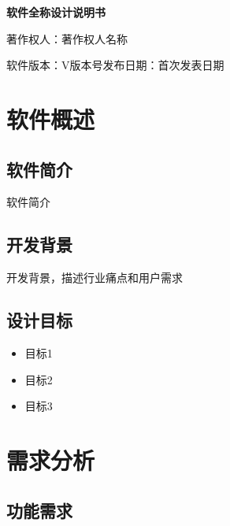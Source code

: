 \documentclass[a4paper,12pt]{article}
\begin{document}
\begin{center}
  {\LARGE\bfseries {{软件全称}}\quad 设计说明书}

  \vspace{0.8em}
  {\large 著作权人：{{著作权人名称}}}

  \vspace{0.3em}
  软件版本：V{{版本号}}\qquad 发布日期：{{首次发表日期}}
\end{center}

\vspace{1.5em}

\section{软件概述}

\subsection{软件简介}

{{软件简介}}

\subsection{开发背景}

{{开发背景，描述行业痛点和用户需求}}

\subsection{设计目标}

\begin{itemize}[leftmargin=2em]
  \item {{目标1}}
  \item {{目标2}}
  \item {{目标3}}
\end{itemize}


\section{需求分析}

\subsection{功能需求}
\end{document}
